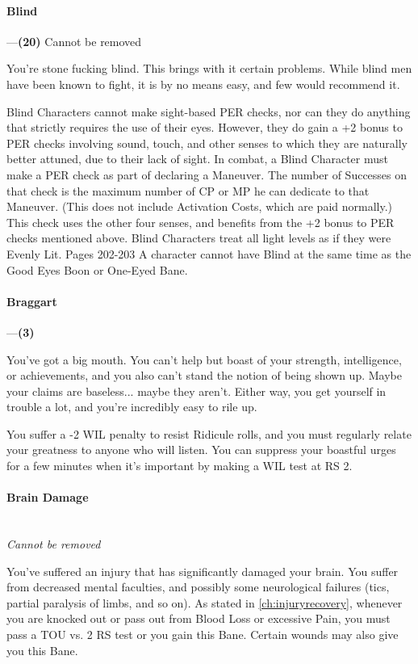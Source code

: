 \documentclass[oneside,11pt,english]{book}
\begin{document}
\paragraph{\label{bane:Blind}Blind}---\quad\textbf{(20)}
{Cannot be removed}\par
You're stone fucking blind. This brings with it certain problems. While blind men have been known to fight, it is by no means easy, and few would recommend it. 

Blind Characters cannot make sight-based PER checks, nor can they do anything that strictly requires the 
use of their eyes. However, they do gain a +2 bonus to PER checks involving sound, touch, and other 
senses to which they are naturally better attuned, due to their lack of sight. In combat, a Blind Character 
must make a PER check as part of declaring a Maneuver. The number of Successes on that check is the 
maximum number of CP or MP he can dedicate to that Maneuver. (This does not include Activation 
Costs, which are paid normally.) 
This check uses the other four senses, and benefits from the +2 bonus to PER checks mentioned above. 
Blind Characters treat all light levels as if they were Evenly Lit. Pages 202-203 
A character cannot have Blind at the same time as the Good Eyes Boon or One-Eyed Bane. 
\paragraph{\label{bane:Braggart}Braggart}---\quad\textbf{(3)}\par
You've got a big mouth. You can't help but boast of your strength, intelligence, or achievements, and you 
also can't stand the notion of being shown up. Maybe your claims are baseless... maybe they aren't. Either 
way, you get yourself in trouble a lot, and you're incredibly easy to rile up. 


You suffer a -2 WIL penalty to resist Ridicule rolls, and you must regularly relate your greatness to 
anyone who will listen. You can suppress your boastful urges for a few minutes when it's important by 
making a WIL test at RS 2. 

 

\paragraph{\label{bane:Brain Damage}Brain Damage}\quad\\
\textit{Cannot be removed}\par
You've suffered an injury that has significantly damaged your brain. You suffer from decreased mental 
faculties, and possibly some neurological failures (tics, partial paralysis of limbs, and so on). As stated in \autoref{ch:injuryrecovery}, whenever you are knocked out or pass out from Blood Loss or excessive Pain, you must pass a TOU vs. 2 RS test or you gain this Bane. Certain wounds may also give you this Bane. 
\end{document}
